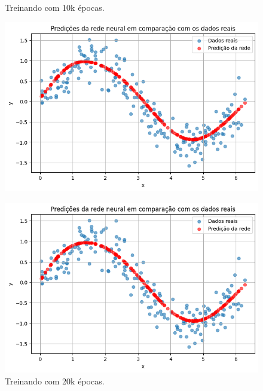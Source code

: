 \begin{figure}[htb]
\begin{minipage}{0.45\textwidth}
        \centering
        \caption{Treinando com 10k épocas.}\label{tarefa02:10000:predicoes}
        \includegraphics[width=\textwidth]{./0803_imgs/png-241110-154812342-18762265025268743.png}
    \end{minipage}
	\hfill
	\begin{minipage}{0.45\textwidth}
	\centering
	\caption{Treinando com 20k épocas.}\label{tarefa02:20000:predicoes}
	\includegraphics[width=\textwidth]{./0803_imgs/png-241110-155300412-9439382542521307108.png}
	\end{minipage}
\end{figure}

